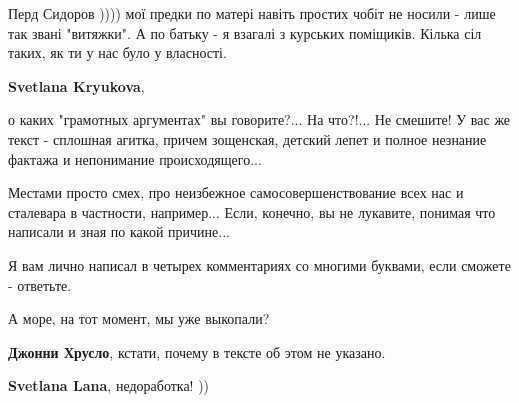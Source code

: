 \begin{itemize}
\begin{itemize}
 
Перд Сидоров )))) мої предки по матері навіть простих чобіт не носили - лише
так звані "витяжки". А по батьку - я взагалі з курських поміщиків. Кілька сіл
таких, як ти у нас було у власності.
\end{itemize}

 
\textbf{Svetlana Kryukova}, 

о каких "грамотных аргументах" вы говорите?... На что?!... Не смешите! У вас же
текст - сплошная агитка, причем зощенская, детский лепет и полное незнание
фактажа и непонимание происходящего... 

Местами просто смех, про неизбежное самосовершенствование всех нас и сталевара
в частности, например... Если, конечно, вы не лукавите, понимая что написали и
зная по какой причине... 

Я вам лично написал в четырех комментариях со многими буквами, если сможете -
ответьте.

 
А море, на тот момент, мы уже выкопали?

\begin{itemize}
 
\textbf{Джонни Хрусло}, кстати, почему в тексте об этом не указано.

 
\textbf{Svetlana Lana}, недоработка! ))


\end{itemize}
\end{itemize}

